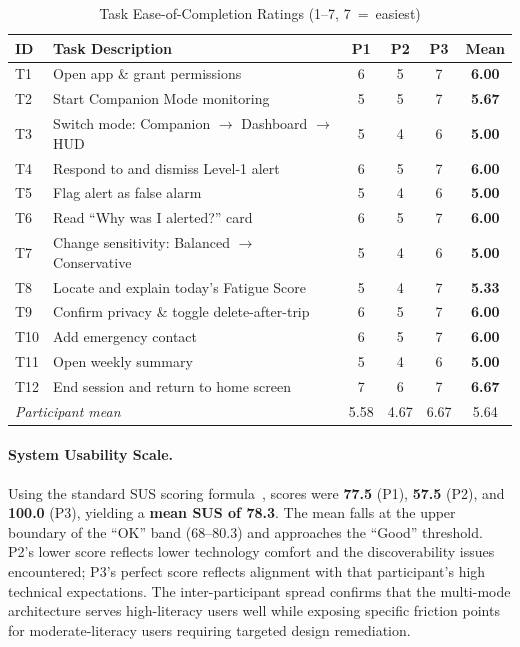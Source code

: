\documentclass[sigconf]{acmart}
\begin{document}
\begin{table}[H]
\centering
\caption{Task Ease-of-Completion Ratings (1--7, 7~=~easiest)}
\label{tab:task_results}
\small
\begin{tabular}{p{0.5cm}p{4cm}ccc>{\bfseries}c}
\toprule
\textbf{ID} & \textbf{Task Description} & \textbf{P1} & \textbf{P2} & \textbf{P3} & Mean \\
\midrule
T1 & Open app \& grant permissions & 6 & 5 & 7 & 6.00 \\
T2 & Start Companion Mode monitoring & 5 & 5 & 7 & 5.67 \\
T3 & Switch mode: Companion $\to$ Dashboard $\to$ HUD & 5 & 4 & 6 & 5.00 \\
T4 & Respond to and dismiss Level-1 alert & 6 & 5 & 7 & 6.00 \\
T5 & Flag alert as false alarm & 5 & 4 & 6 & 5.00 \\
T6 & Read ``Why was I alerted?'' card & 6 & 5 & 7 & 6.00 \\
T7 & Change sensitivity: Balanced $\to$ Conservative & 5 & 4 & 6 & 5.00 \\
T8 & Locate and explain today's Fatigue Score & 5 & 4 & 7 & 5.33 \\
T9 & Confirm privacy \& toggle delete-after-trip & 6 & 5 & 7 & 6.00 \\
T10 & Add emergency contact & 6 & 5 & 7 & 6.00 \\
T11 & Open weekly summary & 5 & 4 & 6 & 5.00 \\
T12 & End session and return to home screen & 7 & 6 & 7 & 6.67 \\
\midrule
\multicolumn{2}{l}{\textit{Participant mean}} & 5.58 & 4.67 & 6.67 & 5.64 \\
\bottomrule
\end{tabular}
\end{table}

\paragraph{System Usability Scale.}
Using the standard SUS scoring formula~\cite{ref15}, scores were \textbf{77.5} (P1), \textbf{57.5} (P2), and \textbf{100.0} (P3), yielding a \textbf{mean SUS of 78.3}. The mean falls at the upper boundary of the ``OK'' band (68--80.3) and approaches the ``Good'' threshold. P2's lower score reflects lower technology comfort and the discoverability issues encountered; P3's perfect score reflects alignment with that participant's high technical expectations. The inter-participant spread confirms that the multi-mode architecture serves high-literacy users well while exposing specific friction points for moderate-literacy users requiring targeted design remediation.
\end{document}
